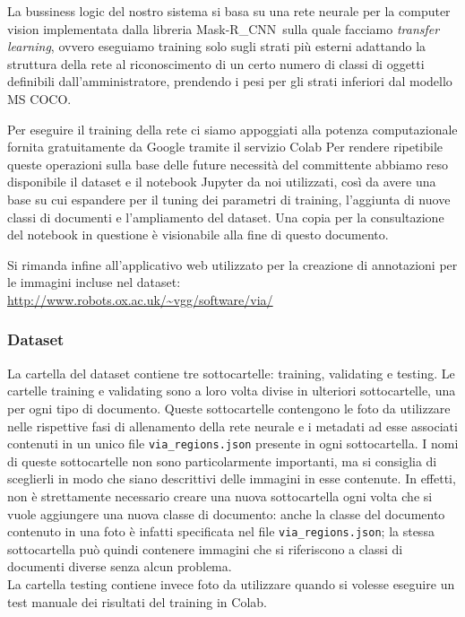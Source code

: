 \documentclass[12pt,a4paper]{article}
\newcommand{\mrcnn}{Mask-R\_CNN}
\begin{document}
La bussiness logic del nostro sistema si basa su una rete neurale per la
computer vision implementata dalla libreria \mrcnn\ sulla quale facciamo
\textit{transfer learning}, ovvero eseguiamo training solo sugli strati
più esterni adattando la struttura della rete al riconoscimento di un
certo numero di classi di oggetti definibili dall'amministratore,
prendendo i pesi per gli strati inferiori dal modello MS COCO.

Per eseguire il training della rete ci siamo appoggiati alla potenza
computazionale fornita gratuitamente da Google tramite il servizio Colab
Per rendere ripetibile queste operazioni sulla base delle future
necessità del committente abbiamo reso disponibile il dataset e il
notebook Jupyter da noi utilizzati, così da avere una base su cui
espandere per il tuning dei parametri di training, l'aggiunta di nuove
classi di documenti e l'ampliamento del dataset. Una copia per la
consultazione del notebook in questione è visionabile alla fine di
questo documento.

Si rimanda infine all'applicativo web utilizzato per la
creazione di annotazioni per le immagini incluse nel dataset:\\
\url{http://www.robots.ox.ac.uk/~vgg/software/via/}

\subsubsection{Dataset}

La cartella del dataset contiene tre sottocartelle: training, validating
e testing. Le cartelle training e validating sono a loro volta divise in
ulteriori sottocartelle, una per ogni tipo di documento. Queste
sottocartelle contengono le foto da utilizzare nelle rispettive fasi di
allenamento della rete neurale e i metadati ad esse associati contenuti
in un unico file \texttt{via\_regions.json} presente in ogni
sottocartella. I nomi di queste sottocartelle non sono particolarmente
importanti, ma si consiglia di sceglierli in modo che siano descrittivi
delle immagini in esse contenute. In effetti, non è strettamente
necessario creare una nuova sottocartella ogni volta che si vuole
aggiungere una nuova classe di documento: anche la classe del documento
contenuto in una foto è infatti specificata nel file
\texttt{via\_regions.json}; la stessa sottocartella può quindi contenere
immagini che si riferiscono a classi di documenti diverse senza alcun
problema.\\ La cartella testing contiene invece foto da utilizzare
quando si volesse eseguire un test manuale dei risultati del training in
Colab.
\end{document}
